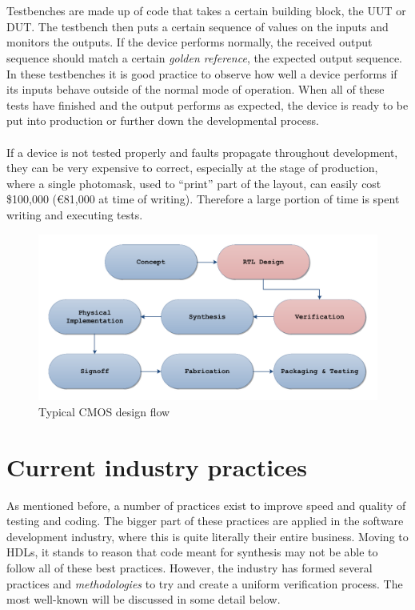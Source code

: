 \documentclass[11pt,british]{article}
\begin{document}
\\
\\
Testbenches are made up of code that takes a certain building block, the \gls{UUT} or \gls{DUT}. The testbench then puts a certain sequence of values on the inputs and monitors the outputs. If the device performs normally, the received output sequence should match a certain \emph{golden reference}, the expected output sequence. In these testbenches it is good practice to observe how well a device performs if its inputs behave outside of the normal mode of operation. When all of these tests have finished and the output performs as expected, the device is ready to be put into production or further down the developmental process.
\\
\\
If a device is not tested properly and faults propagate throughout development, they can be very expensive to correct, especially at the stage of production, where a single photomask, used to ``print'' part of the layout, can easily cost \$100,000 (\euro81,000 at time of writing)\cite{weber06}. Therefore a large portion of time is spent writing and executing tests.

\begin{figure}[h]
    \centering
	\includegraphics[width=\textwidth]{images/VHDLflow.pdf}
    \caption{Typical CMOS design flow}
    \label{fig:Design_Flow}
\end{figure}

\newpage

\section{Current industry practices}
\label{sec:industry}
As mentioned before, a number of practices exist to improve speed and quality of testing and coding. The bigger part of these practices are applied in the software development industry, where this is quite literally their entire business. Moving to \gls{HDL}s, it stands to reason that code meant for synthesis may not be able to follow all of these best practices. However, the industry has formed several practices and \emph{methodologies} to try and create a uniform verification process. The most well-known will be discussed in some detail below.
\end{document}
